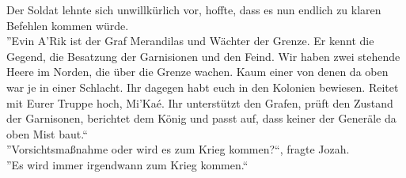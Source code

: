 Der Soldat lehnte sich unwillkürlich vor, hoffte, dass es nun endlich zu klaren Befehlen kommen 
würde.\\
''Evin A'Rik ist der Graf Merandilas und Wächter der Grenze. Er kennt die Gegend, die 
Besatzung der Garnisionen und den Feind. Wir haben zwei stehende Heere im Norden, die über die 
Grenze wachen. Kaum einer von denen da oben war je in einer Schlacht. Ihr dagegen habt euch in den 
Kolonien bewiesen. Reitet mit Eurer Truppe hoch, Mi'Kaé. Ihr unterstützt den Grafen, prüft den 
Zustand der Garnisonen, berichtet dem König und passt auf, dass keiner der Generäle da oben Mist 
baut.``\\
''Vorsichtsmaßnahme oder wird es zum Krieg kommen?``, fragte Jozah.\\
''Es wird immer irgendwann zum Krieg kommen.``\\

